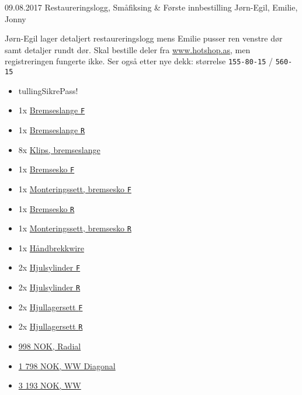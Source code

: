 \worklogitem
	{09.08.2017}
	{Restaureringslogg, Småfiksing \& Første innbestilling}
	{J\o rn-Egil, Emilie, Jonny}
	{J\o rn-Egil lager detaljert restaureringslogg mens Emilie pusser ren venstre d\o r samt detaljer rundt d\o r. Skal bestille deler fra \url{www.hotshop.as}, men registreringen fungerte ikke. Ser også etter nye dekk: størrelse \texttt{155-80-15} / \texttt{560-15}
	\begin{itemize}

		\item tullingSikrePass!
		\item 1x \href{http://www.hotshop.as/index.php/nb/butikk/produkt/11713-bremseslange-fram-1964}{Bremseslange \texttt{F}}
		\item 1x \href{http://www.hotshop.as/index.php/nb/butikk/produkt/9491-bremseslange-bak}{Bremseslange \texttt{R}}
		\item 8x \href{http://www.hotshop.as/index.php/nb/butikk/produkt/9493-klips-bremseslanger}{Klips, bremseslange}
		\item 1x \href{http://www.hotshop.as/index.php/nb/butikk/produkt/9547-bremsesko-fram-58-64}{Bremsesko \texttt{F}}
		\item 1x \href{http://www.hotshop.as/index.php/nb/butikk/produkt/9548-mont-sett-bremsesko-fram-58-64}{Monteringssett, bremsesko \texttt{F}}
		\item 1x \href{http://www.hotshop.as/index.php/nb/butikk/produkt/9549-bremsesko-bak-58-64}{Bremsesko \texttt{R}}
		\item 1x \href{http://www.hotshop.as/index.php/nb/butikk/produkt/9550-mont-sett-bremsesko-b58-67}{Monteringssett, bremsesko \texttt{R}}
		\item 1x \href{http://www.hotshop.as/index.php/nb/butikk/produkt/9479-handbrekkwire-t-1-58-64}{Håndbrekkwire}
		\item 2x \href{http://www.hotshop.as/index.php/nb/butikk/produkt/9531-hjulsylinder-front-58-77}{Hjulsylinder \texttt{F}}
		\item 2x \href{http://www.hotshop.as/index.php/nb/butikk/produkt/9532-hjulsylinder-bak-58-67}{Hjulsylinder \texttt{R}}
		\item 2x \href{http://www.hotshop.as/index.php/nb/butikk/produkt/8936-hjullagersett-fram-48-65}{Hjullagersett \texttt{F}}
		\item 2x \href{http://www.hotshop.as/index.php/nb/butikk/produkt/8830-hjullagersett-bak-sving}{Hjullagersett \texttt{R}}

		\item \href{https://www.eiker.no/F700066/main.aspx?page=article&artno=1515580RBFGOODTA}{998 NOK, Radial}
		\item \href{https://www.eiker.no/F700066/main.aspx?page=article&artno=15560DFSTWW1}{1 798 NOK, WW Diagonal}
		\item \href{https://www.dekkonline.com/cgi-bin/rshop.pl?details=Ordern&typ=R-256631}{3 193 NOK, WW}
	\end{itemize}
	}

